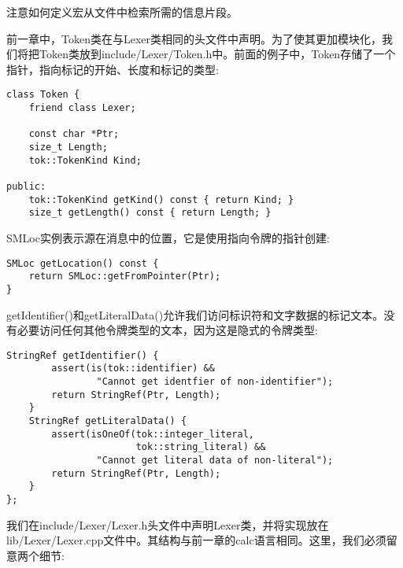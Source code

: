 \begin{tcolorbox}[colback=blue!5!white,colframe=blue!75!black,title=Tip]
注意如何定义宏从文件中检索所需的信息片段。
\end{tcolorbox}

前一章中，Token类在与Lexer类相同的头文件中声明。为了使其更加模块化，我们将把Token类放到include/Lexer/Token.h中。前面的例子中，Token存储了一个指针，指向标记的开始、长度和标记的类型:\par

\begin{lstlisting}[caption={}]
class Token {
	friend class Lexer;
	
	const char *Ptr;
	size_t Length;
	tok::TokenKind Kind;
	
public:
	tok::TokenKind getKind() const { return Kind; }
	size_t getLength() const { return Length; }
\end{lstlisting}

SMLoc实例表示源在消息中的位置，它是使用指向令牌的指针创建:\par

\begin{lstlisting}[caption={}]
SMLoc getLocation() const {
	return SMLoc::getFromPointer(Ptr);
}
\end{lstlisting}

getIdentifier()和getLiteralData()允许我们访问标识符和文字数据的标记文本。没有必要访问任何其他令牌类型的文本，因为这是隐式的令牌类型:\par

\begin{lstlisting}[caption={}]
	StringRef getIdentifier() {
		assert(is(tok::identifier) &&
				"Cannot get identfier of non-identifier");
		return StringRef(Ptr, Length);
	}
	StringRef getLiteralData() {
		assert(isOneOf(tok::integer_literal,
					   tok::string_literal) &&
				"Cannot get literal data of non-literal");
		return StringRef(Ptr, Length);
	}
};
\end{lstlisting}

我们在include/Lexer/Lexer.h头文件中声明Lexer类，并将实现放在lib/Lexer/Lexer.cpp文件中。其结构与前一章的calc语言相同。这里，我们必须留意两个细节:\par


